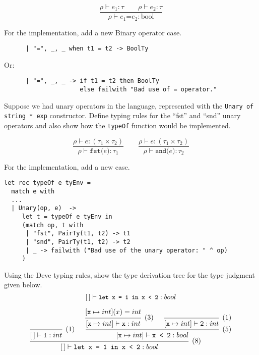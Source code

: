 \documentclass[addpoints]{exam}
\newcommand{\TJDG}[3]{#1 \vdash #2 : #3}
\begin{document}
\begin{questions}
  \begin{solutionbox}{5cm}
    \[
    \frac{\TJDG{\rho}{e_1}{\tau} \qquad \TJDG{\rho}{e_2}{\tau}}
         {\TJDG{\rho}{\texttt{$e_1$=$e_2$}}{\mathrm{bool}}}
    \]

    For the implementation, add a new Binary operator case.

    \begin{verbatim}
      | "=", _, _ when t1 = t2 -> BoolTy
    \end{verbatim}

    Or:

    \begin{verbatim}
      | "=", _, _ -> if t1 = t2 then BoolTy
                     else failwith "Bad use of = operator."
    \end{verbatim}
  \end{solutionbox}

  \question
  Suppose we had unary operators in the language,
  represented with the \texttt{Unary of string * exp}
  constructor.
  Define typing rules for the ``fst'' and ``snd'' unary operators and
  also show how the \texttt{typeOf} function would be implemented.

  \begin{solutionbox}{7cm}
    \[
    \frac{\TJDG{\rho}{e}{(\tau_1\times\tau_2)}}
         {\TJDG{\rho}{\texttt{fst($e$)}}{\tau_1}}
    \qquad
    \frac{\TJDG{\rho}{e}{(\tau_1\times\tau_2)}}
         {\TJDG{\rho}{\texttt{snd($e$)}}{\tau_2}}
    \]

    For the implementation, add a new case.

    \begin{verbatim}
let rec typeOf e tyEnv =
  match e with
  ...
  | Unary(op, e)  ->
     let t = typeOf e tyEnv in
     (match op, t with
      | "fst", PairTy(t1, t2) -> t1
      | "snd", PairTy(t1, t2) -> t2
      | _ -> failwith ("Bad use of the unary operator: " ^ op)
     )
    \end{verbatim}
  \end{solutionbox}

  \question
  Using the Deve typing rules,
  show the type derivation tree for the type judgment
  given below.
  \[
  \small
  \TJDG{[\,]}{\texttt{let x = 1 in x < 2}}{bool} 
  \]

  \begin{solutionbox}{3cm}
    \[
    \begin{prooftree}
        \infer0[(1)]{\TJDG{[\,]}{\texttt{1}}{int}}
            \hypo{[\texttt{x}\mapsto int](x) = int}
          \infer1[(3)]{\TJDG{[\texttt{x}\mapsto int]}{\texttt{x}}{int}}
          \infer0[(1)]{\TJDG{[\texttt{x}\mapsto int]}{\texttt{2}}{int}}
        \infer2[(5)]{\TJDG{[\texttt{x}\mapsto int]}{\texttt{x < 2}}{bool}}
      \infer2[(8)]{\TJDG{[\,]}{\texttt{let x = 1 in x < 2}}{bool}}
    \end{prooftree}
    \]
  \end{solutionbox}


\end{questions}
\end{document}

